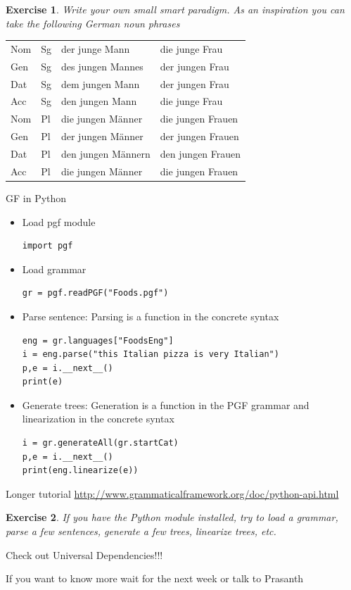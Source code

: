 \documentclass{beamer}
\newtheorem{exercise}{Exercise}
\begin{document}
\begin{frame}
  \begin{exercise}
    Write your own small smart paradigm. As an inspiration you can take the following German noun phrases
  \end{exercise}
    \begin{tabular}{llll}
      Nom & Sg & der junge Mann     & die junge Frau \\
      Gen & Sg & des jungen Mannes  & der jungen Frau \\
      Dat & Sg & dem jungen Mann    & der jungen Frau \\
      Acc & Sg & den jungen Mann    & die junge Frau \\
      Nom & Pl & die jungen Männer  & die jungen Frauen \\
      Gen & Pl & der jungen Männer  & der jungen Frauen \\
      Dat & Pl & den jungen Männern & den jungen Frauen \\
      Acc & Pl & die jungen Männer  & die jungen Frauen \\
    \end{tabular}
\end{frame}

\begin{frame}[fragile]{GF in Python}
  \begin{itemize}
  \item Load pgf module
\begin{verbatim}
import pgf
\end{verbatim}
\item Load grammar
\begin{verbatim}
gr = pgf.readPGF("Foods.pgf")
\end{verbatim}
\item Parse sentence: Parsing is a function in the concrete syntax
\begin{verbatim}
eng = gr.languages["FoodsEng"]
i = eng.parse("this Italian pizza is very Italian")
p,e = i.__next__()
print(e)
\end{verbatim}
\item Generate trees: Generation is a function in the PGF grammar and linearization in the concrete syntax
\begin{verbatim}
i = gr.generateAll(gr.startCat)
p,e = i.__next__()
print(eng.linearize(e))
\end{verbatim}
  \end{itemize}
  Longer tutorial \url{http://www.grammaticalframework.org/doc/python-api.html}
\end{frame}
\begin{frame}
  \begin{exercise}
    If you have the Python module installed, try to load a grammar, parse a few sentences, generate a few trees, linearize trees, etc.
  \end{exercise}
\end{frame}

\begin{frame}
  Check out Universal Dependencies!!!

  If you want to know more wait for the next week or talk to Prasanth
\end{frame}
\end{document}
